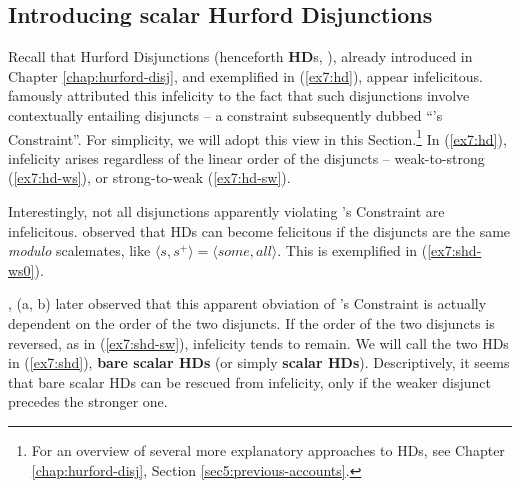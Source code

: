\subsection{Introducing scalar Hurford Disjunctions}
Recall that Hurford Disjunctions (henceforth \textbf{HD}s, ), already introduced in Chapter \ref{chap:hurford-disj}, and exemplified in (\ref{ex7:hd}), appear infelicitous. \citeauthor{Hurford1974} famously attributed this infelicity to the fact that such disjunctions involve contextually entailing disjuncts -- a constraint subsequently dubbed ``\citeauthor{Hurford1974}'s Constraint''. For simplicity, we will adopt this view in this Section.\footnote{For an overview of several more explanatory approaches to HDs, see Chapter \ref{chap:hurford-disj}, Section \ref{sec5:previous-accounts}.} In (\ref{ex7:hd}), infelicity arises regardless of the linear order of the disjuncts -- weak-to-strong (\ref{ex7:hd-ws}), or strong-to-weak (\ref{ex7:hd-sw}). 


\begin{exe}
	\ex\label{ex7:hd}
	\begin{xlist}
		\label{ex7:hd-ws}
		\label{ex7:hd-sw}
	\end{xlist}
\end{exe}


Interestingly, not all disjunctions apparently violating \citeauthor{Hurford1974}'s Constraint are infelicitous. \textcite{Gazdar1979} observed that HDs can become felicitous if the disjuncts are the same \textit{modulo} scalemates, like $\langle s, s^+ \rangle = \langle \textit{some}, \textit{all} \rangle$. This is exemplified in (\ref{ex7:shd-ws0}).


\begin{exe}
	\label{ex7:shd-ws0}
\end{exe}

\citeauthor{Singh2008}, (\citeyear{Singh2008a}a, \citeyear{Singh2008b}b) later observed that this apparent obviation of \citeauthor{Hurford1974}'s Constraint is actually dependent on the order of the two disjuncts. If the order of the two disjuncts is reversed, as in (\ref{ex7:shd-sw}), infelicity tends to remain. We will call the two HDs in (\ref{ex7:shd}), \textbf{bare scalar HDs} (or simply \textbf{scalar HDs}). Descriptively, it seems that bare scalar HDs can be rescued from infelicity, only if the weaker disjunct precedes the stronger one.


